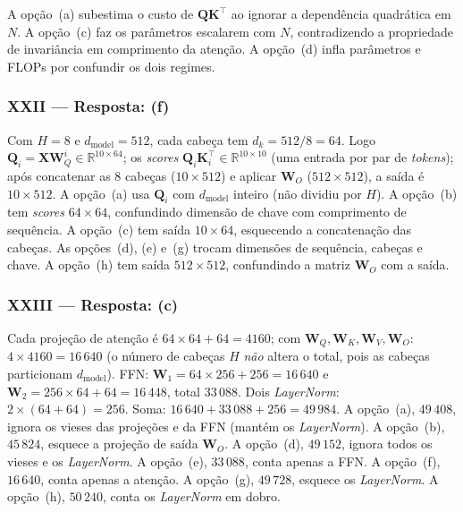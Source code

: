 \documentclass{dlproblemset}
\begin{document}
A opção~(a) subestima o custo de $\mathbf{Q}\mathbf{K}^\top$ ao ignorar a dependência
quadrática em $N$. A opção~(c) faz os parâmetros escalarem com $N$,
contradizendo a propriedade de invariância em comprimento da atenção.
A opção~(d) infla parâmetros e FLOPs por confundir os dois regimes.

\subsubsection*{XXII — Resposta: (f)}
Com $H = 8$ e $d_{\text{model}} = 512$, cada cabeça tem $d_k = 512/8 = 64$. Logo
$\mathbf{Q}_i = \mathbf{X} \mathbf{W}_Q^i \in \mathbb{R}^{10 \times 64}$; os
\textit{scores} $\mathbf{Q}_i \mathbf{K}_i^\top \in \mathbb{R}^{10 \times 10}$ (uma
entrada por par de \textit{tokens}); após concatenar as $8$ cabeças ($10 \times 512$)
e aplicar $\mathbf{W}_O$ ($512\times 512$), a saída é $10 \times 512$.
A opção~(a) usa $\mathbf{Q}_i$ com $d_{\text{model}}$ inteiro (não dividiu por $H$).
A opção~(b) tem \textit{scores} $64\times 64$, confundindo dimensão de chave com
comprimento de sequência. A opção~(c) tem saída $10\times 64$, esquecendo a
concatenação das cabeças. As opções~(d), (e) e~(g) trocam dimensões de sequência,
cabeças e chave. A opção~(h) tem saída $512\times 512$, confundindo a matriz
$\mathbf{W}_O$ com a saída.

\subsubsection*{XXIII — Resposta: (c)}
Cada projeção de atenção é $64\times 64 + 64 = 4160$; com
$\mathbf{W}_Q, \mathbf{W}_K, \mathbf{W}_V, \mathbf{W}_O$: $4 \times 4160 = 16\,640$ (o
número de cabeças $H$ \emph{não} altera o total, pois as cabeças particionam
$d_{\text{model}}$). FFN: $\mathbf{W}_1 = 64\times 256 + 256 = 16\,640$ e
$\mathbf{W}_2 = 256\times 64 + 64 = 16\,448$, total $33\,088$. Dois \textit{LayerNorm}:
$2 \times (64 + 64) = 256$. Soma: $16\,640 + 33\,088 + 256 = 49\,984$.
A opção~(a), $49\,408$, ignora os vieses das projeções e da FFN (mantém os
\textit{LayerNorm}). A opção~(b), $45\,824$, esquece a projeção de saída
$\mathbf{W}_O$. A opção~(d), $49\,152$, ignora todos os vieses e os \textit{LayerNorm}.
A opção~(e), $33\,088$, conta apenas a FFN. A opção~(f), $16\,640$, conta apenas a
atenção. A opção~(g), $49\,728$, esquece os \textit{LayerNorm}. A opção~(h),
$50\,240$, conta os \textit{LayerNorm} em dobro.
\end{document}
